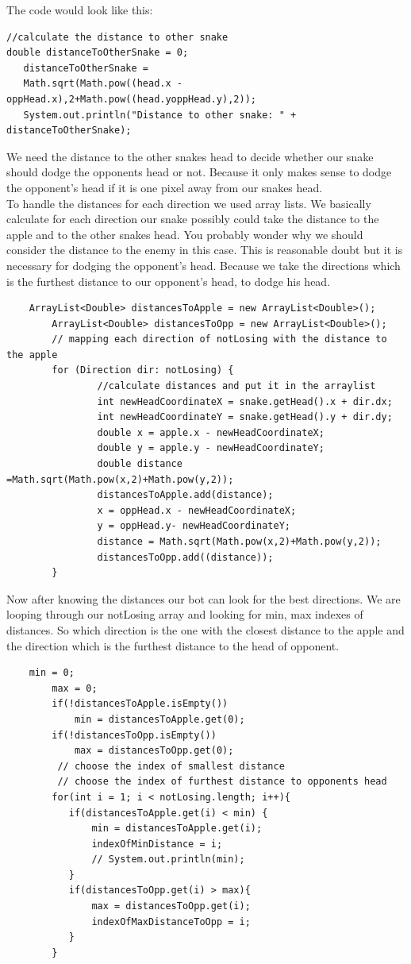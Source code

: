 \documentclass[a4paper,12pt]{article}
\begin{document}
\newpage
The code would look like this:
\begin{verbatim}
//calculate the distance to other snake
double distanceToOtherSnake = 0;
   distanceToOtherSnake =  
   Math.sqrt(Math.pow((head.x - oppHead.x),2+Math.pow((head.yoppHead.y),2));
   System.out.println("Distance to other snake: " + distanceToOtherSnake);
\end{verbatim}
We need the distance to the other snakes head to decide whether our snake should dodge the opponents head or not. Because it only makes sense to dodge the opponent's head if it is one pixel away from our snakes head.\\
To handle the distances for each direction we used array lists. We basically calculate for each direction our snake possibly could take the  distance to the apple and to the other snakes head. You probably wonder why we should consider the distance to the enemy in this case. This is reasonable doubt but it is necessary for dodging the opponent's head. Because we take the directions which is the furthest distance to our opponent's head, to dodge his head.\\
\begin{verbatim}
	ArrayList<Double> distancesToApple = new ArrayList<Double>();
        ArrayList<Double> distancesToOpp = new ArrayList<Double>();
        // mapping each direction of notLosing with the distance to the apple
        for (Direction dir: notLosing) {
                //calculate distances and put it in the arraylist
                int newHeadCoordinateX = snake.getHead().x + dir.dx;
                int newHeadCoordinateY = snake.getHead().y + dir.dy;
                double x = apple.x - newHeadCoordinateX;
                double y = apple.y - newHeadCoordinateY;
                double distance =Math.sqrt(Math.pow(x,2)+Math.pow(y,2));
                distancesToApple.add(distance);
                x = oppHead.x - newHeadCoordinateX;
                y = oppHead.y- newHeadCoordinateY;
                distance = Math.sqrt(Math.pow(x,2)+Math.pow(y,2));
                distancesToOpp.add((distance));
        }
\end{verbatim}
Now after knowing the distances our bot can look for the best directions. We are looping through our notLosing array and looking for min, max indexes of distances. So which direction is the one with the closest distance to the apple and the direction which is the furthest distance to the head of opponent.
\newpage
\begin{verbatim}
	min = 0;
        max = 0;
        if(!distancesToApple.isEmpty())
            min = distancesToApple.get(0);
        if(!distancesToOpp.isEmpty())
            max = distancesToOpp.get(0);
         // choose the index of smallest distance
         // choose the index of furthest distance to opponents head
        for(int i = 1; i < notLosing.length; i++){
           if(distancesToApple.get(i) < min) {
               min = distancesToApple.get(i);
               indexOfMinDistance = i;
               // System.out.println(min);
           }
           if(distancesToOpp.get(i) > max){
               max = distancesToOpp.get(i);
               indexOfMaxDistanceToOpp = i;
           }
        }
\end{verbatim}
\end{document}
